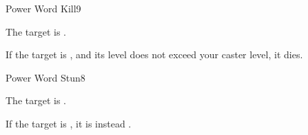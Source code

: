\begin{spellsection}{Power Word Kill}{9}
\begin{spellheader}
\end{spellheader}
\begin{spellcontent}
    \begin{spelltargetinginfo}
    \end{spelltargetinginfo}
    \begin{spelleffects}
        \spelleffect The target is \sickened.

        If the target is \bloodied, and its level does not exceed your caster level, it dies.
        \spelldur \durshort
    \end{spelleffects}
\end{spellcontent}
\begin{spellfooter}
\end{spellfooter}
\end{spellsection}

\begin{spellsection}{Power Word Stun}{8}
\begin{spellheader}
\end{spellheader}
\begin{spellcontent}
    \begin{spelltargetinginfo}
    \end{spelltargetinginfo}
    \begin{spelleffects}
        \spelleffect The target is \bewildered.

        If the target is \bloodied, it is instead \stunned.
        \spelldur \durshort
    \end{spelleffects}
\end{spellcontent}
\begin{spellfooter}
\end{spellfooter}
\end{spellsection}

